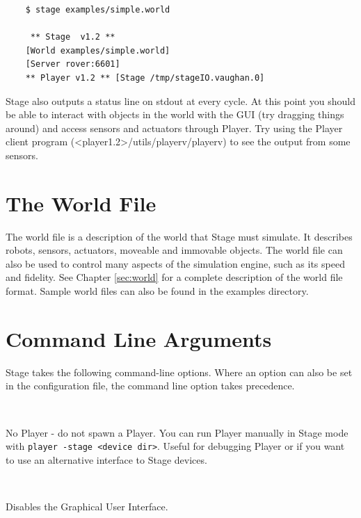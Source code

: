 \documentclass[11pt]{report}
\newenvironment{xarg}[1]{\noindent{\tt #1}\\\hspace*{2em}\begin{minipage}[t]{5in}}{\end{minipage}\vspace*{1em}}
\begin{document}
	\begin{verbatim} 
	$ stage examples/simple.world

	 ** Stage  v1.2 ** 
	[World examples/simple.world]
	[Server rover:6601]
	** Player v1.2 ** [Stage /tmp/stageIO.vaughan.0]
      \end{verbatim}

    Stage also outputs a status line on stdout at every cycle.  At
    this point you should be able to interact with objects in the
    world with the GUI (try dragging things around) and access sensors
    and actuators through Player. Try using the Player client program
    (<player1.2>/utils/playerv/playerv) to see the output from some
    sensors.

  
  \section{The World File}

    The world file is a description of the world that Stage
    must simulate.  It describes robots, sensors, actuators,
    moveable and immovable objects.  The world file can also
    be used to control many aspects of the simulation engine,
    such as its speed and fidelity.  
    See Chapter \ref{sec:world} for a complete description of
    the world file format.  Sample world files can also be
    found in the examples directory.

  \section{Command Line Arguments}

    Stage takes the following command-line options. Where an option
    can also be set in the configuration file, the command line option
    takes precedence.

    \begin{xarg}{-n} No Player - do not spawn a Player. You can run
    Player manually in Stage mode with
    \verb+player -stage <device dir>+. Useful for debugging Player or
    if you want to use an alternative interface to Stage
    devices.
    \end{xarg}

    \begin{xarg}{-g}Disables the Graphical User Interface.
    \end{xarg}
\end{document}
